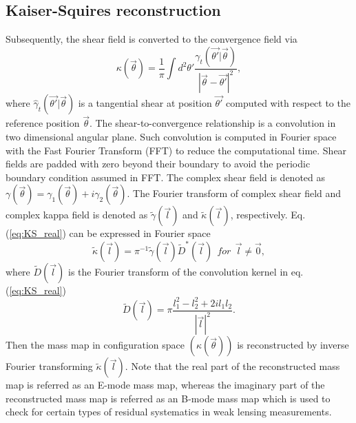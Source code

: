\documentclass[twocolumn]{aastex62}
\begin{document}
\subsection{Kaiser-Squires reconstruction}
\label{subsec:kappaMap-KS}
Subsequently, the shear field is converted to the convergence field via \citep{massMap-KS1993}
\begin{equation}\label{eq:KS_real}
\kappa(\vec{\theta})=\frac{1}{\pi} \int d^2\theta' \frac{\gamma_t(\vec{\theta'}|\vec{\theta})}{|\vec{\theta}-\vec{\theta'}|^2},
\end{equation}
where $\hat{\gamma}_t(\vec{\theta'}|\vec{\theta})$ is a tangential shear at position $\vec{\theta'}$ computed with respect to the reference position $\vec{\theta}$. The shear-to-convergence relationship is a convolution in two dimensional angular plane. Such convolution is computed in Fourier space with the Fast Fourier Transform (FFT) to reduce the computational time. Shear fields are padded with zero beyond their boundary to avoid the periodic boundary condition assumed in FFT. The complex shear field is denoted as $\gamma(\vec{\theta})=\gamma_1(\vec{\theta})+i\gamma_2(\vec{\theta})$. The Fourier transform of complex shear field and complex kappa field is denoted as $\tilde{\gamma}(\vec{l})$ and $\tilde{\kappa}(\vec{l})$, respectively. Eq. (\ref{eq:KS_real}) can be expressed in Fourier space
\begin{equation}
\tilde{\kappa}(\vec{l})=\pi^{-1}\tilde{\gamma}(\vec{l})\tilde{D}^{*}(\vec{l}) ~~ for ~~\vec{l}\neq\vec{0},
\end{equation}
where $\tilde{D}(\vec{l})$ is the Fourier transform of the convolution kernel in eq. (\ref{eq:KS_real})
\begin{equation}
\tilde{D}(\vec{l})=\pi \frac{l_1^2-l_2^2+2il_1l_2}{|\vec{l}|^2}.
\end{equation}
\break
Then the mass map in configuration space $(\kappa(\vec{\theta}))$ is reconstructed by inverse Fourier transforming $\tilde{\kappa} (\vec{l})$.
Note that the real part of the reconstructed mass map is referred as an E-mode mass map, whereas the imaginary part of the reconstructed mass map is referred as an B-mode mass map which is used to check for certain types of residual systematics in weak lensing measurements.
\end{document}
